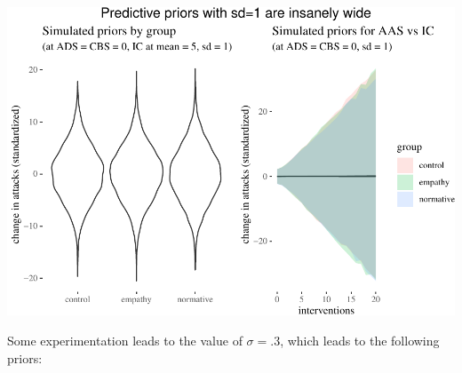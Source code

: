\documentclass[
  10pt,
  dvipsnames,enabledeprecatedfontcommands]{scrartcl}
\begin{document}
\begin{center}\includegraphics[width=1\linewidth]{bayesianReport3_files/figure-latex/priors1-1} \end{center}
\normalsize

Some experimentation leads to the value of \(\sigma =.3\), which leads
to the following priors:

\vspace{1mm}
\footnotesize
\end{document}
